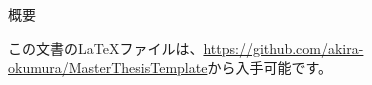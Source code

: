 \documentclass[twoside,openright,a4paper,papersize,uplatex,dvipdfmx]{jsbook}
\begin{document}
\frontmatter

\maketitle

\thispagestyle{empty}

\begin{center}
  {\large \sf 概要}
\end{center}



この文書の\LaTeX {}ファイルは、\url{https://github.com/akira-okumura/MasterThesisTemplate}から入手可能です。

\tableofcontents
\listoffigures
\listoftables

\mainmatter














\renewcommand{\bibname}{引用文献}
%
\ifdefined\bynumber

\else

\fi

\label{page:bib}
\end{document}
